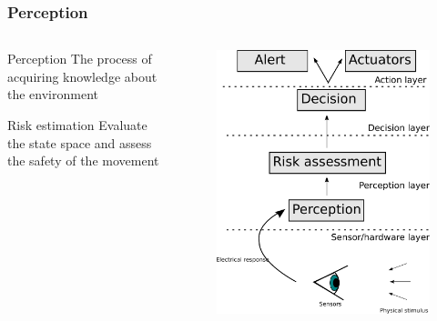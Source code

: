 \documentclass{beamer}
\begin{document}
	\begin{frame}
		\frametitle{Perception}	
		
		\begin{columns}[t]
		  \begin{column}{6cm}

			\begin{block}{Perception}
					The process of acquiring knowledge about the environment \cite{iyengar1991autonomous}
			\end{block}		
	
			\begin{block}{Risk estimation}
					Evaluate the state space and assess the safety of the movement
			\end{block}				  
		  
		  \end{column}
		  
		  \begin{column}{6cm}
			\begin{figure}[h]
				\center
				\includegraphics[scale=0.23]{../img/fig:sensors:roles}
			\end{figure}
		  \end{column}
		 \end{columns}		
		


\end{frame}
\end{document}
